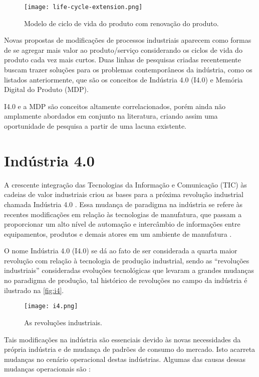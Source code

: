 	\begin{figure}[htb]
		\centering
		\caption{Modelo de ciclo de vida do produto com renovação do produto.}
		\label{fig:life-cycle-extension}
		\texttt{[image: life-cycle-extension.png]}
	\end{figure}
	
	Novas propostas de modificações de processos industriais aparecem como formas de se agregar mais valor ao produto/serviço considerando os ciclos de vida do produto cada vez mais curtos. Duas linhas de pesquisas criadas recentemente buscam trazer soluções para os problemas contemporâneos da indústria, como os listados anteriormente, que são os conceitos de Indústria 4.0 (I4.0) e Memória Digital do Produto (MDP).
	
	I4.0 e a MDP são conceitos altamente correlacionados, porém ainda não amplamente abordados em conjunto na literatura, criando assim uma oportunidade de pesquisa a partir de uma lacuna existente.
	
	
\section{Indústria 4.0}

	A crescente integração das Tecnologias da Informação e Comunicação (TIC) às cadeias de valor industriais criou as bases para a próxima revolução industrial chamada Indústria 4.0 \cite{hermann2016design}. Essa mudança de paradigma na indústria se refere às recentes modificações em relação às tecnologias de manufatura, que passam a proporcionar um alto nível de automação e intercâmbio de informações entre equipamentos, produtos e demais atores em um ambiente de manufatura \cite{lasi2014industryfour}. 
	
	O nome Indústria 4.0 (I4.0) se dá ao fato de ser considerada a quarta maior revolução com relação à tecnologia de produção industrial, sendo as ``revoluções industriais'' consideradas evoluções tecnológicas que levaram a grandes mudanças no paradigma de produção, tal histórico de revoluções no campo da indústria é ilustrado na \autoref{fig:i4}.

	\begin{figure}[htb]
		\centering
		\caption{As revoluções industriais.}
		\label{fig:i4}
		\texttt{[image: i4.png]}
	\end{figure}

	Tais modificações na indústria são essenciais devido às novas necessidades da própria indústria e de mudança de padrões de consumo do mercado. Isto acarreta mudanças no cenário operacional destas indústrias. Algumas das causas dessas mudanças operacionais são \cite{lasi2014industryfour}:
	
